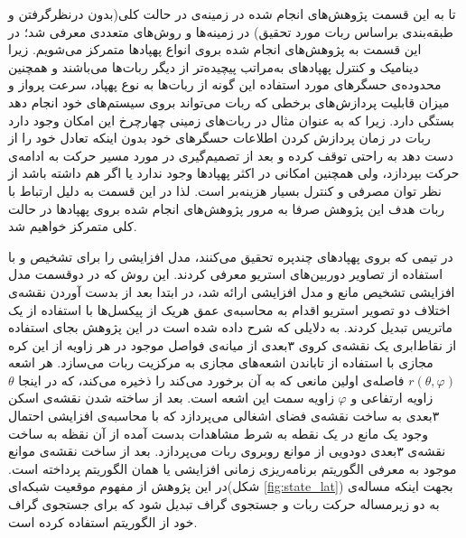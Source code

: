 تا به این قسمت پژوهش‌های انجام شده در زمینه‌ی  در حالت کلی(بدون درنظرگرفتن و طبقه‌بندی براساس ربات مورد تحقیق) در زمینه‌ها و روش‌های متعددی معرفی شد؛ در این قسمت به پژوهش‌های انجام شده بروی انواع پهپادها متمرکز می‌شویم. زیرا دینامیک و کنترل پهپادهای به‌مراتب پیچیده‌تر از دیگر ربات‌ها می‌باشند و همچنین محدوده‌ی حسگرهای مورد استفاده این گونه از ربات‌ها به نوع پهپاد، سرعت پرواز و میزان قابلیت پردازش‌های برخطی که ربات می‌تواند بروی سیستم‌های خود انجام دهد بستگی دارد. زیرا که به عنوان مثال در ربات‌های زمینی چهارچرخ این امکان وجود دارد ربات در زمان پردازش کردن اطلاعات حسگرهای خود بدون اینکه تعادل خود را از دست دهد به راحتی توقف کرده و بعد از تصمیم‌گیری در مورد مسیر حرکت به ادامه‌ی حرکت بپردازد، ولی همچنین امکانی در اکثر پهپادها وجود ندارد یا اگر هم داشته باشد از نظر توان مصرفی و کنترل بسیار هزینه‌بر است. لذا در این قسمت به دلیل ارتباط با ربات هدف این پژوهش صرفا به مرور پژوهش‌های انجام شده بروی پهپادها در حالت کلی متمرکز خواهیم شد.

در  تیمی که بروی پهپادهای چندپره تحقیق می‌کنند، مدل افزایشی را برای تشخیص و  با استفاده از تصاویر دوربین‌های استریو معرفی کردند. این روش که در دوقسمت مدل افزایشی تشخیص مانع و مدل افزایشی  ارائه شد، در ابتدا بعد از بدست آوردن نقشه‌ی اختلاف دو تصویر استریو اقدام به محاسبه‌ی عمق هریک از پیکسل‌ها با استفاده از یک ماتریس تبدیل کردند. به دلایلی که شرح داده شده است در این پژوهش بجای استفاده از نقاط‌ابری یک نقشه‌ی کروی ۳بعدی از میانه‌ی فواصل موجود در هر زاویه‌ از این کره مجازی با استفاده از تاباندن اشعه‌های مجازی به مرکزیت ربات می‌سازد. هر اشعه $r(\theta, \varphi)$ فاصله‌ی اولین مانعی که به آن برخورد می‌کند را ذخیره می‌کند، که در اینجا $\theta$ زاویه ارتفاعی و $\varphi$ زاویه سمت این اشعه است. بعد از ساخته شدن نقشه‌ی اسکن ۳بعدی به ساخت نقشه‌ی فضای اشغالی می‌پردازد که با محاسبه‌ی افزایشی احتمال وجود یک مانع در یک نقطه به شرط مشاهدات بدست آمده از آن نقظه به ساخت نقشه‌ی ۳بعدی دودویی از موانع روبروی ربات می‌پردازد. بعد از ساخت نقشه‌ی موانع موجود به معرفی الگوریتم برنامه‌ریزی زمانی افزایشی یا همان الگوریتم  پرداخته است. در این پژوهش از مفهوم موقعیت شبکه‌ای(شکل \ref{fig:state_lat}) بجهت اینکه مساله‌ی  به دو زیرمساله حرکت ربات و جستجوی گراف تبدیل شود که برای جستجوی گراف خود از الگوریتم  استفاده کرده است.


